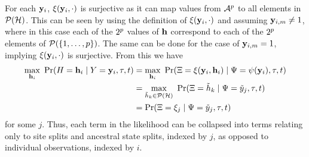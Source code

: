 For each $\mathbf{y}_i$, $\xi(\mathbf{y}_i, \cdot)$ is surjective as it can map values from $\mathcal{A}^p$ to all elements in $\mathcal{P}(\mathcal{H})$.
This can be seen by using the definition of $\xi(\mathbf{y}_i, \cdot)$ and assuming $\mathbf{y}_{i,m}\neq 1$, where in this case each of the $2^p$ values of $\mathbf{h}$ correspond to each of the $2^p$ elements of $\mathcal{P}(\{1,\ldots,p\})$.
The same can be done for the case of $\mathbf{y}_{i,m}=1$, implying $\xi(\mathbf{y}_i, \cdot)$ is surjective.
From this we have
\begin{align*}
    \max_{\ancestralStateColumn_i} \ \Pr(\ancestralStateColumnRV=\ancestralStateColumn_i \mid \alignmentColumnRV=\alignmentColumn_i, \tau, t) &= \max_{\ancestralStateColumn_i} \ \Pr(\ancestralSplitRV=\ancestralToSplit(\alignmentColumn_i, \ancestralStateColumn_i) \mid \siteSplitRV=\patternToSplit(\alignmentColumn_i), \tau, t)\\
    &= \max_{\ancestralSplit_k\in\mathcal{P}(\ancestralSplitSet)} \ \Pr(\ancestralSplitRV=\ancestralSplit_k \mid \siteSplitRV=\siteSplit_j, \tau, t)\\
    &= \Pr(\ancestralSplitRV = \xi_j \mid \siteSplitRV=\siteSplit_j, \tau, t)
\end{align*}
for some $j$.
Thus, each term in the likelihood can be collapsed into terms relating only to site splits and ancestral state splits, indexed by $j$, as opposed to individual observations, indexed by $i$.

